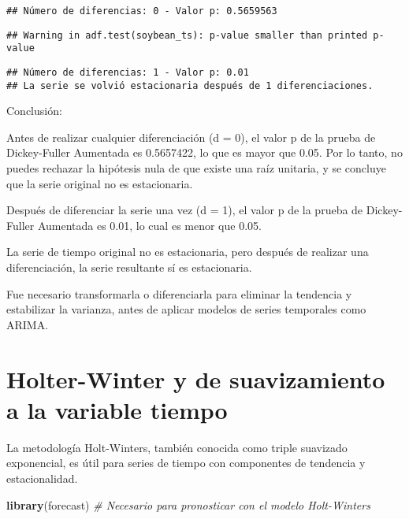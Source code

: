 \documentclass[
]{book}
\newenvironment{Shaded}{\begin{snugshade}}{\end{snugshade}}
\newcommand{\CommentTok}[1]{\textcolor[rgb]{0.56,0.35,0.01}{\textit{#1}}}
\newcommand{\FunctionTok}[1]{\textcolor[rgb]{0.13,0.29,0.53}{\textbf{#1}}}
\newcommand{\NormalTok}[1]{#1}
\begin{document}
\begin{verbatim}
## Número de diferencias: 0 - Valor p: 0.5659563
\end{verbatim}

\begin{verbatim}
## Warning in adf.test(soybean_ts): p-value smaller than printed p-value
\end{verbatim}

\begin{verbatim}
## Número de diferencias: 1 - Valor p: 0.01 
## La serie se volvió estacionaria después de 1 diferenciaciones.
\end{verbatim}

Conclusión:

Antes de realizar cualquier diferenciación (d = 0), el valor p de la prueba de Dickey-Fuller Aumentada es 0.5657422, lo que es mayor que 0.05. Por lo tanto, no puedes rechazar la hipótesis nula de que existe una raíz unitaria, y se concluye que la serie original no es estacionaria.

Después de diferenciar la serie una vez (d = 1), el valor p de la prueba de Dickey-Fuller Aumentada es 0.01, lo cual es menor que 0.05.

La serie de tiempo original no es estacionaria, pero después de realizar una diferenciación, la serie resultante sí es estacionaria.

Fue necesario transformarla o diferenciarla para eliminar la tendencia y estabilizar la varianza, antes de aplicar modelos de series temporales como ARIMA.

\hypertarget{holter-winter-y-de-suavizamiento-a-la-variable-tiempo}{%
\chapter{Holter-Winter y de suavizamiento a la variable tiempo}\label{holter-winter-y-de-suavizamiento-a-la-variable-tiempo}}

La metodología Holt-Winters, también conocida como triple suavizado exponencial, es útil para series de tiempo con componentes de tendencia y estacionalidad.

\begin{Shaded}
\begin{Highlighting}[]
\FunctionTok{library}\NormalTok{(forecast)  }\CommentTok{\# Necesario para pronosticar con el modelo Holt{-}Winters}
\end{Highlighting}
\end{Shaded}
\end{document}
